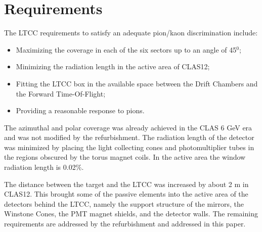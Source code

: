 \section{Requirements}


The LTCC requirements to satisfy an adequate pion/kaon discrimination include:


\begin{itemize}
	\item Maximizing the coverage in each of the six sectors up to an angle of 45$^0$;
	\item Minimizing the radiation length in the active area of CLAS12;
	\item Fitting the LTCC box in the available space between the Drift Chambers and the Forward Time-Of-Flight;
	\item Providing a reasonable response to pions.
\end{itemize}

The azimuthal and polar coverage was already achieved in the CLAS 6 GeV era and was not modified by the refurbishment.
The radiation length of the detector was minimized by placing the light collecting cones and photomultiplier tubes
in the regions obscured by the torus magnet coils. In the active area the window radiation length is 0.02$\%$.

The distance between the target and the LTCC was increased by about 2 m in CLAS12. This brought some of the passive
elements into the active area of the detectors behind the LTCC, namely the support structure of the mirrors, the Winstone
Cones, the PMT magnet shields, and the detector walls.
The remaining requirements are addressed by the refurbishment and addressed in this paper.
